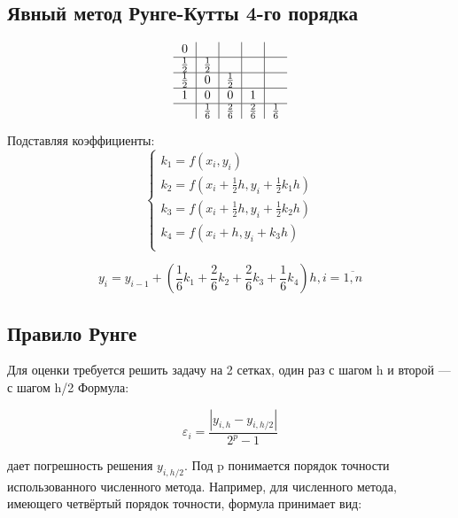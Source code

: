 \documentclass[oneside, final, 11pt]{article}
\begin{document}
\subsection{Явный метод Рунге-Кутты 4-го порядка}
\begin{equation}
\begin{tabular}{c|c|c|c|c}
    0           &   &   &   &                   \\\hline   
$\frac{1}{2}$   & $\frac{1}{2}$  &   &   &      \\\hline 
$\frac{1}{2}$   & 0  & $\frac{1}{2}$  &   &     \\\hline 
    1           & 0  & 0  & 1  &                \\\hline 
                & $\frac{1}{6}$ & $\frac{2}{6}$ & $\frac{2}{6}$ & $\frac{1}{6}$\\
\end{tabular}
\end{equation}

Подставляя коэффициенты: 
\begin{equation}
    \begin{cases}
    k_1 = f(x_i, y_i) \\
    k_2 = f(x_i + \frac{1}{2} h, y_i + \frac{1}{2} k_1 h) \\
    k_3 = f(x_i + \frac{1}{2} h, y_i + \frac{1}{2} k_2 h) \\
    k_4 = f(x_i + h, y_i + k_3 h) \\
    \end{cases}
\end{equation}

\begin{equation}
y_i = y_{i-1} + ( \frac{1}{6} k_1 + \frac{2}{6} k_2 + \frac{2}{6} k_3 + \frac{1}{6} k_4) h, i=\overline{1,n}
\end{equation}

\subsection{Правило Рунге}
Для оценки требуется решить задачу на 2 сетках, один раз с шагом h и второй — с шагом h/2 Формула:

\begin{equation}
\varepsilon_i = \frac{|y_{i,h}-y_{i,h/2}|}{2^{p}-1}
\end{equation}

дает погрешность решения $y_{i,h/2}$. Под p понимается порядок точности использованного численного метода. Например, для численного метода, имеющего четвёртый порядок точности, формула принимает вид:
\end{document}
